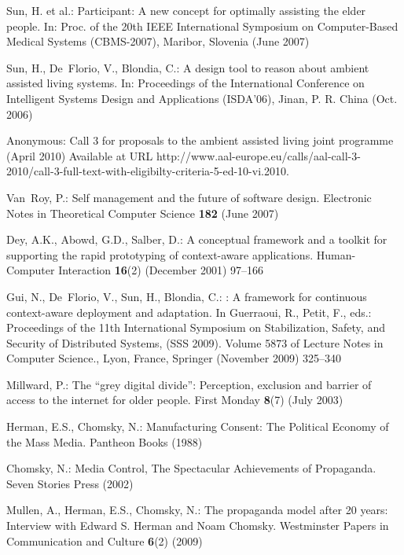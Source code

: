 \documentclass{llncs}
\begin{document}
\begin{thebibliography}{10}
Sun, H. et al.:
\newblock Participant: A new concept for optimally assisting the elder people.
\newblock In: Proc. of the 20th IEEE International Symposium on
  Computer-Based Medical Systems (CBMS-2007), Maribor, Slovenia
  (June 2007)

Sun, H., De~Florio, V., Blondia, C.:
\newblock A design tool to reason about ambient assisted living systems.
\newblock In: Proceedings of the International Conference on
  Intelligent Systems Design and Applications (ISDA'06), Jinan, P. R.
  China (Oct. 2006)

Anonymous:
\newblock Call 3 for proposals to the ambient assisted living joint programme
  (April 2010) Available at URL
  http://www.aal-europe.eu/calls/aal-call-3-2010/call-3-full-text-with-eligibilty-criteria-5-ed-10-vi.2010.

Van~Roy, P.:
\newblock Self management and the future of software design.
\newblock Electronic Notes in Theoretical Computer Science \textbf{182} (June
  2007)

Dey, A.K., Abowd, G.D., Salber, D.:
\newblock A conceptual framework and a toolkit for supporting the rapid
  prototyping of context-aware applications.
\newblock Human-Computer Interaction \textbf{16}(2) (December 2001)  97--166

Gui, N., De~Florio, V., Sun, H., Blondia, C.:
: A framework for continuous context-aware deployment and
  adaptation.
\newblock In Guerraoui, R., Petit, F., eds.: Proceedings of the 11th
  International Symposium on Stabilization, Safety, and Security of Distributed
  Systems, (SSS 2009). Volume 5873 of Lecture Notes in Computer Science., Lyon,
  France, Springer (November 2009)  325--340

Millward, P.:
\newblock The ``grey digital divide'': Perception, exclusion and barrier of
  access to the internet for older people.
\newblock First Monday \textbf{8}(7) (July 2003)

Herman, E.S., Chomsky, N.:
\newblock Manufacturing Consent: The Political Economy of the Mass Media.
\newblock Pantheon Books (1988)

Chomsky, N.:
\newblock Media Control, The Spectacular Achievements of Propaganda.
\newblock Seven Stories Press (2002)

Mullen, A., Herman, E.S., Chomsky, N.:
\newblock The propaganda model after 20 years: Interview with {Edward S. Herman
  and Noam Chomsky}.
\newblock Westminster Papers in Communication and Culture \textbf{6}(2) (2009)


\end{thebibliography}
\end{document}
